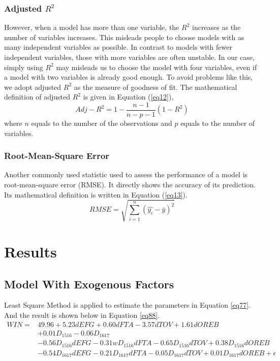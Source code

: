 \documentclass[12pt, a4paper]{article}
\begin{document}
\begin{spacing}{1.5}
\subsubsection{Adjusted $R^2$}
However, when a model has more than one variable, the $R^2$ increases as the number of variables increases. This misleads people to choose models with as many independent variables as possible. In contrast to models with fewer independent variables, those with more variables are often unstable. In our case, simply using $R^2$ may misleads us to choose the model with four variables, even if a model with two variables is already good enough. To avoid problems like this, we adopt adjusted $R^2$ as the measure of goodness of fit. The mathematical definition of adjusted $R^2$ is given in Equation (\ref{eq12}),
\begin{equation}
	Adj-R^2 = 1 - \frac{n-1}{n-p-1}(1-R^2)
	\label{eq12}
\end{equation}
where $n$ equals to the number of the observations and $p$ equals to the number of variables.
\subsubsection{Root-Mean-Square Error}
Another commonly used statistic used to assess the performance of a model is root-mean-square error (RMSE). It directly shows the accuracy of its prediction. Its mathematical definition is written in Equation (\ref{eq13}).
\begin{equation}
	RMSE = \sqrt{\sum_{i=1}^n{(\hat{y_i}-\bar{y})^2}}
	\label{eq13}
\end{equation}
\section{Results}
\subsection{Model With Exogenous Factors}
Least Square Method is applied to estimate the parameters in Equation \ref{eq77}. And the result is shown below in Equation \ref{eq88}.
\begin{equation}
\label{eq88}
\begin{split}
WIN=& 49.96+5.23dEFG + 0.60dFTA-3.57dTOV+1.61dOREB \\
&+ 0.01D_{1516}-0.06D_{1617}\\
&-0.56D_{1516}dEFG-0.31wD_{1516}dFTA-0.65D_{1516}dTOV+0.38D_{1516}dOREB\\
&-0.54D_{1617}dEFG-0.21D_{1617}dFTA-0.05D_{1617}dTOV+0.01D_{1617}dOREB + \epsilon \\
\end{split}
\end{equation}


\end{spacing}
\end{document}
